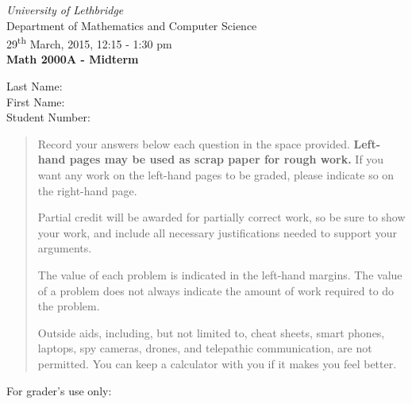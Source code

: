 \documentclass[12pt]{article}
\newcommand{\skipline}{\vspace{12pt}}
\begin{document}
\author{Instructor: Sean Fitzpatrick}
\thispagestyle{plain}
\begin{center}
\emph{University of Lethbridge}\\
Department of Mathematics and Computer Science\\
29\textsuperscript{th} March, 2015, 12:15 - 1:30 pm\\
{\bf Math 2000A - Midterm}\\
\end{center}
\skipline \skipline \skipline \noindent \skipline
Last Name:\underline{\hspace{350pt}}\\
\skipline
First Name:\underline{\hspace{348pt}}\\
\skipline
Student Number:\underline{\hspace{322pt}}\\


\vspace{0.5in}


\begin{quote}
 Record your answers below each question in the space provided.    {\bf Left-hand pages may be used as scrap paper for rough work.}  If you want any work on the left-hand pages to be graded, please indicate so on the right-hand page.
 
 \bigskip
 
Partial credit will be awarded for partially correct work, so be sure to show your work, and include all necessary justifications needed to support your arguments. 

The value of each problem is indicated in the left-hand margins. The value of a problem does not always indicate the amount of work required to do the problem.

Outside aids, including, but not limited to, cheat sheets, smart phones, laptops, spy cameras, drones, and telepathic communication, are not permitted. You can keep a calculator with you if it makes you feel better.
\end{quote}


\vspace{0.5in}

For grader's use only:
\end{document}
